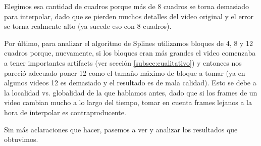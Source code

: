 Elegimos esa cantidad de cuadros porque más de 8 cuadros se torna demasiado para interpolar, dado que se pierden muchos detalles del video original y el error se torna realmente alto (ya sucede eso con 8 cuadros).

Por último, para analizar el algoritmo de Splines utilizamos bloques de 4, 8 y 12 cuadros porque, nuevamente, si los bloques eran más grandes el video comenzaba a tener importantes artifacts (ver sección \ref{subsec:cualitativo}) y entonces nos pareció adecuado poner 12 como el tamaño máximo de bloque a tomar (ya en algunos videos 12 es demasiado y el resultado es de mala calidad). Esto se debe a la localidad vs. globalidad de la que hablamos antes, dado que si los frames de un video cambian mucho a lo largo del tiempo, tomar en cuenta frames lejanos a la hora de interpolar es contraproducente.

Sin más aclaraciones que hacer, pasemos a ver y analizar los resultados que obtuvimos.



